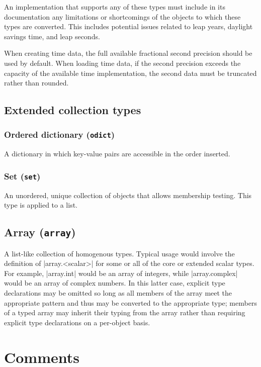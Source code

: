 \documentclass[11pt]{article}
\begin{document}
An implementation that supports any of these types must include in its documentation any limitations or shortcomings of the objects to which these types are converted.  This includes potential issues related to leap years, daylight savings time, and leap seconds.

When creating time data, the full available fractional second precision should be used by default.  When loading time data, if the second precision exceeds the capacity of the available time implementation, the second data must be truncated rather than rounded.



\subsection{Extended collection types}

\subsubsection{Ordered dictionary (\texttt{odict})}

A dictionary in which key-value pairs are accessible in the order inserted.


\subsubsection{Set (\texttt{set})}

An unordered, unique collection of objects that allows membership testing.  This type is applied to a list.


\subsection{Array (\texttt{array})}

A list-like collection of homogenous types.  Typical usage would involve the definition of |array.<scalar>| for some or all of the core or extended scalar types.  For example, |array.int| would be an array of integers, while |array.complex| would be an array of complex numbers.  In this latter case, explicit type declarations may be omitted so long as all members of the array meet the appropriate pattern and thus may be converted to the appropriate type; members of a typed array may inherit their typing from the array rather than requiring explicit type declarations on a per-object basis.



\section{Comments}
\end{document}
